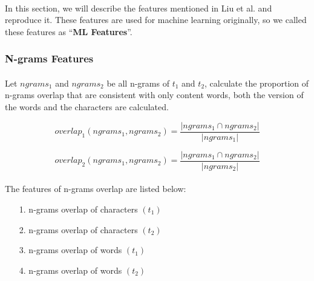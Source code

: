 \documentclass{article}
\begin{document}
\begin{CJK*}{UTF8}{bkai}
\paragraph{}
In this section, we will describe the features mentioned in Liu et al.\cite{liu_2016} and reproduce it. These features are used for machine learning originally, so we called these features as ``\textbf{ML Features}''.

\subsubsection{N-grams Features}
\paragraph{}
Let $ngrams_1$ and $ngrams_2$ be all n-grams of $t_1$ and $t_2$, calculate the proportion of n-grams overlap that are consistent with only content words, both the version of the words and the characters are calculated.

\begin{equation}
  overlap_1(ngrams_1,ngrams_2)=\frac{|ngrams_1\cap ngrams_2|}{|ngrams_1|}
\end{equation}

\begin{equation}
  overlap_2(ngrams_1,ngrams_2)=\frac{|ngrams_1\cap ngrams_2|}{|ngrams_2|}
\end{equation}

\paragraph{}
The features of n-grams overlap are listed below:


\begin{enumerate}
    \item[ 1.] n-grams overlap of characters $(t_1)$
    \item[ 2.] n-grams overlap of characters $(t_2)$
    \item[ 3.] n-grams overlap of words $(t_1)$
    \item[ 4.] n-grams overlap of words $(t_2)$
\end{enumerate}


\end{CJK*}
\end{document}
